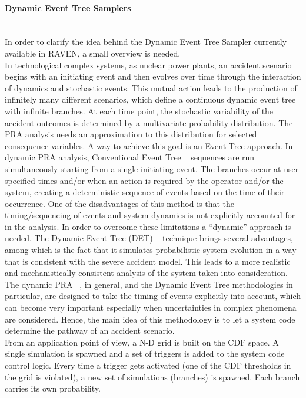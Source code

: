 \paragraph{Dynamic Event Tree Samplers}~\\
In order to clarify the idea behind the Dynamic Event Tree Sampler currently available in RAVEN, a small overview is needed. 
\\In technological complex systems, as nuclear power plants, an accident scenario begins with an initiating event and then evolves over time through the interaction of dynamics and stochastic events. This mutual action leads to the production of infinitely many different scenarios, which define a continuous dynamic event tree with infinite branches. At each time point, the stochastic variability of the accident outcomes is determined by a multivariate probability distribution. The PRA analysis needs an approximation to this distribution for selected consequence variables. A way to achieve this goal is an Event Tree approach. In dynamic PRA analysis, Conventional Event Tree ~\cite{} sequences are run simultaneously starting from a single initiating event. The branches occur at user specified times and/or when an action is required by the operator and/or the system, creating a deterministic sequence of events based on the time of their occurrence. One of the disadvantages of this method is that the timing/sequencing of events and system dynamics is not explicitly accounted for in the analysis. In order to overcome these limitations a “dynamic” approach is needed. The Dynamic Event Tree (DET) ~\cite{} technique brings several advantages, among which is the fact that it simulates probabilistic system evolution in a way that is consistent with the severe accident model. This leads to a more realistic and mechanistically consistent analysis of the system taken into consideration. The dynamic PRA ~\cite{}, in general, and the Dynamic Event Tree methodologies in particular, are designed to take the timing of events explicitly into account, which can become very important especially when uncertainties in complex phenomena are considered. Hence, the main idea of this methodology is to let a system code determine the pathway of an accident scenario.
\\From an application point of view, a N-D grid is built on the CDF space. A single simulation is spawned and a set of triggers is added to the system code control logic. Every time a trigger gets activated (one of the CDF thresholds in the grid is violated), a new set of simulations (branches) is spawned. Each branch carries its own probability. 
